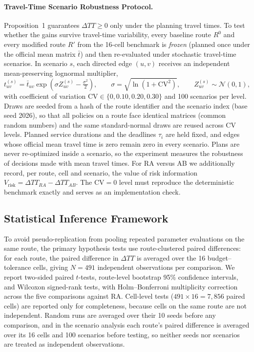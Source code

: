 \documentclass[11pt,a4paper]{article}
\begin{document}
\paragraph{Travel-Time Scenario Robustness Protocol.}
Proposition~1 guarantees $\Delta TT \ge 0$ only under the planning travel times. To test whether the gains survive travel-time variability, every baseline route $R^0$ and every modified route $R'$ from the 16-cell benchmark is \emph{frozen} (planned once under the official mean matrix $\bar{t}$) and then re-evaluated under stochastic travel-time scenarios. In scenario $s$, each directed edge $(u,v)$ receives an independent mean-preserving lognormal multiplier,
\begin{equation}
t^{(s)}_{uv} = \bar{t}_{uv} \exp\!\left(\sigma Z^{(s)}_{uv} - \tfrac{\sigma^2}{2}\right), \qquad \sigma = \sqrt{\ln(1 + \mathrm{CV}^2)}, \qquad Z^{(s)}_{uv} \sim \mathcal{N}(0,1),
\end{equation}
with coefficient of variation $\mathrm{CV} \in \{0, 0.10, 0.20, 0.30\}$ and 100 scenarios per level. Draws are seeded from a hash of the route identifier and the scenario index (base seed 2026), so that all policies on a route face identical matrices (common random numbers) and the same standard-normal draws are reused across CV levels. Planned service durations and the deadlines $\tau_i$ are held fixed, and edges whose official mean travel time is zero remain zero in every scenario. Plans are never re-optimized inside a scenario, so the experiment measures the robustness of decisions made with mean travel times. For RA versus AB we additionally record, per route, cell and scenario, the value of risk information $V_{\text{risk}} = \Delta TT_{RA} - \Delta TT_{AB}$. The $\mathrm{CV}=0$ level must reproduce the deterministic benchmark exactly and serves as an implementation check.

\subsection{Statistical Inference Framework}\label{sec:statistical-framework}
To avoid pseudo-replication from pooling repeated parameter evaluations on the same route, the primary hypothesis tests use route-clustered paired differences: for each route, the paired difference in $\Delta TT$ is averaged over the 16 budget--tolerance cells, giving $N = 491$ independent observations per comparison. We report two-sided paired $t$-tests, route-level bootstrap 95\% confidence intervals, and Wilcoxon signed-rank tests, with Holm--Bonferroni multiplicity correction across the five comparisons against RA. Cell-level tests ($491 \times 16 = 7{,}856$ paired cells) are reported only for completeness, because cells on the same route are not independent. Random runs are averaged over their 10 seeds before any comparison, and in the scenario analysis each route's paired difference is averaged over its 16 cells and 100 scenarios before testing, so neither seeds nor scenarios are treated as independent observations.
\end{document}
